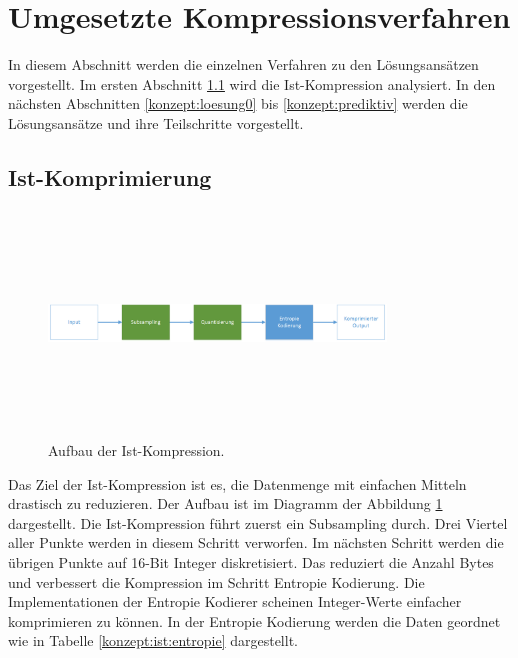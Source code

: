 \section{Umgesetzte Kompressionsverfahren} \label{konzept}
In diesem Abschnitt werden die einzelnen Verfahren zu den Lösungsansätzen vorgestellt. Im ersten Abschnitt \ref{konzept:ist-komprimierung} wird die Ist-Kompression analysiert. In den nächsten Abschnitten \ref{konzept:loesung0} bis \ref{konzept:prediktiv} werden die Lösungsansätze und ihre Teilschritte vorgestellt.

\subsection{Ist-Komprimierung} \label{konzept:ist-komprimierung}
\begin{figure}[!htbp]
	\center
	\includegraphics[width=0.8\textwidth,height=6cm,keepaspectratio]{./pictures/konzept/ist/aufbau.png}
	\caption{Aufbau der Ist-Kompression.}
	\label{konzept:ist:aufbau:diagramm}
\end{figure}
Das Ziel der Ist-Kompression ist es, die Datenmenge mit einfachen Mitteln drastisch zu reduzieren. Der Aufbau ist im Diagramm der Abbildung \ref{konzept:ist:aufbau:diagramm} dargestellt. Die Ist-Kompression führt zuerst ein Subsampling durch. Drei Viertel aller Punkte werden in diesem Schritt verworfen. Im nächsten Schritt werden die übrigen Punkte  auf 16-Bit Integer diskretisiert. Das reduziert die Anzahl Bytes und verbessert die Kompression im Schritt Entropie Kodierung. Die Implementationen der Entropie Kodierer scheinen Integer-Werte einfacher komprimieren zu können. In der Entropie Kodierung werden die Daten geordnet wie in Tabelle \ref{konzept:ist:entropie} dargestellt.

